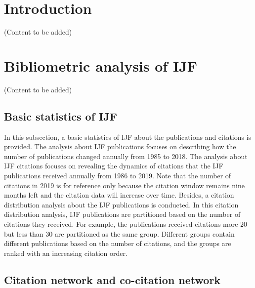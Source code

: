\documentclass[11pt,a4paper]{elsarticle} %
\begin{document}
\newpage

\section{Introduction}\label{introduction}

(Content to be added)

\section{Bibliometric analysis of
IJF}\label{bibliometric-analysis-of-ijf}

(Content to be added)

\subsection{Basic statistics of IJF}\label{basic-statistics-of-ijf}

In this subsection, a basic statistics of IJF about the publications and
citations is provided. The analysis about IJF publications focuses on
describing how the number of publications changed annually from 1985 to
2018. The analysis about IJF citations focuses on revealing the dynamics
of citations that the IJF publications received annually from 1986 to
2019. Note that the number of citations in 2019 is for reference only
because the citation window remains nine months left and the citation
data will increase over time. Besides, a citation distribution analysis
about the IJF publications is conducted. In this citation distribution
analysis, IJF publications are partitioned based on the number of
citations they received. For example, the publications received
citations more 20 but less than 30 are partitioned as the same group.
Different groups contain different publications based on the number of
citations, and the groups are ranked with an increasing citation order.

\subsection{Citation network and co-citation
network}\label{citation-network-and-co-citation-network}
\end{document}
